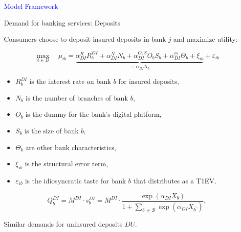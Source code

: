 \documentclass[notes,10pt, aspectratio=169]{beamer}
\newenvironment{wideitemize}{\itemize\addtolength{\itemsep}{10pt}}{\enditemize}
\begin{document}
    
        



\begin{frame}[noframenumbering]

\huge \centering \textcolor{blue}{Model Framework}

\end{frame}
    


\begin{frame}{ Demand for banking services: Deposits}

    \begin{wideitemize}

        \item Consumers choose to deposit insured deposits in bank $j$ and maximize utility:
        
        $$
        \max _{b \in B} \quad \mu_{i b}=\underbrace{\alpha_{D I}^R R_b^{D I}+\alpha_{D I}^N N_b+\alpha_{D I}^{O, S} O_b S_b+\alpha_{D I}^{\ominus} \Theta_b+\xi_{i b}}_{\equiv \alpha_{D I} X_b}+\varepsilon_{i b}
        $$

        \begin{itemize}
            \item $R_b^{D I}$ is the interest rate on bank $b$ for insured deposits,
            \item $N_b$ is the number of branches of bank $b$,
            \item $O_b$ is the dummy for the bank's digital platform,
            \item $S_b$ is the size of bank $b$,
            \item $\Theta_b$ are other bank characteristics,
            \item $\xi_{i b}$ is the structural error term,
            \item $\varepsilon_{i b}$ is the idiosyncratic taste for bank $b$ that distributes as a T1EV.
        \end{itemize}

     $$ Q_b^{D I}=M^{D I} \cdot s_b^{D I}=M^{D I} \cdot \frac{\exp \left(\alpha_{D I} X_b\right)}{1+\sum_{b^{\prime} \in \mathcal{B}} \exp \left(\alpha_{D I} X_{b^{\prime}}\right)},$$
\item Similar demands for uninsured deposits $DU$.
    \end{wideitemize}


    \end{frame}
\end{document}
